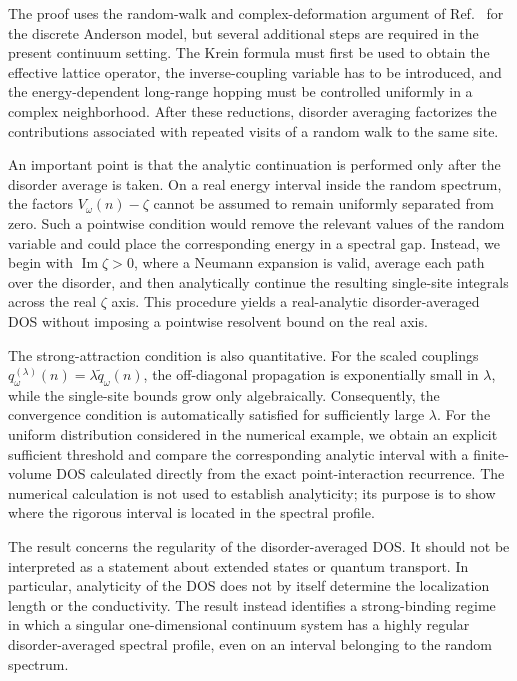\documentclass[12pt,a4paper]{article}
\numberwithin{equation}{section}
\newcommand{\refcite}[1]{\cite{#1}}
\renewcommand{\Im}{\operatorname{Im}}
\begin{document}
The proof uses the random-walk and complex-deformation argument of
Ref.~\refcite{KaminagaKrishnaNakamura2012} for the discrete Anderson model, but
several additional steps are required in the present continuum setting.  The
Krein formula must first be used to obtain the effective lattice operator, the
inverse-coupling variable has to be introduced, and the energy-dependent
long-range hopping must be controlled uniformly in a complex neighborhood.
After these reductions, disorder averaging factorizes the contributions
associated with repeated visits of a random walk to the same site.

An important point is that the analytic continuation is performed only after
the disorder average is taken.  On a real energy interval inside the random
spectrum, the factors $V_\omega(n)-\zeta$ cannot be assumed to remain
uniformly separated from zero.  Such a pointwise condition would remove the
relevant values of the random variable and could place the corresponding
energy in a spectral gap.  Instead, we begin with $\Im\zeta>0$, where a
Neumann expansion is valid, average each path over the disorder, and then
analytically continue the resulting single-site integrals across the real
$\zeta$ axis.  This procedure yields a real-analytic disorder-averaged DOS
without imposing a pointwise resolvent bound on the real axis.

The strong-attraction condition is also quantitative.  For the scaled
couplings $q_\omega^{(\lambda)}(n)=\lambda\widetilde q_\omega(n)$, the
off-diagonal propagation is exponentially small in $\lambda$, while the
single-site bounds grow only algebraically.  Consequently, the convergence
condition is automatically satisfied for sufficiently large $\lambda$.  For
the uniform distribution considered in the numerical example, we obtain an
explicit sufficient threshold and compare the corresponding analytic interval
with a finite-volume DOS calculated directly from the exact point-interaction
recurrence.  The numerical calculation is not used to establish analyticity;
its purpose is to show where the rigorous interval is located in the spectral
profile.

The result concerns the regularity of the disorder-averaged DOS.  It should
not be interpreted as a statement about extended states or quantum transport.
In particular, analyticity of the DOS does not by itself determine the
localization length or the conductivity.  The result instead identifies a
strong-binding regime in which a singular one-dimensional continuum system
has a highly regular disorder-averaged spectral profile, even on an interval
belonging to the random spectrum.
\end{document}
